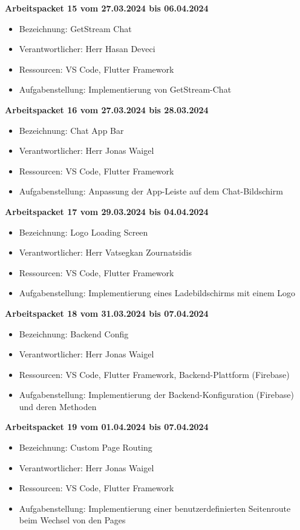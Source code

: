 \textbf{Arbeitspacket 15 vom 27.03.2024 bis 06.04.2024}
\begin{itemize}[itemsep=0pt]
    \item{Bezeichnung: GetStream Chat} 
	\item{Verantwortlicher: Herr Hasan Deveci} 
	\item{Ressourcen: VS Code, Flutter Framework} 
    \item{Aufgabenstellung: Implementierung von GetStream-Chat}
\end{itemize}

\textbf{Arbeitspacket 16 vom 27.03.2024 bis 28.03.2024}
\begin{itemize}[itemsep=0pt]
    \item{Bezeichnung: Chat App Bar}
	\item{Verantwortlicher: Herr Jonas Waigel} 
	\item{Ressourcen: VS Code, Flutter Framework} 
    \item{Aufgabenstellung: Anpassung der App-Leiste auf dem Chat-Bildschirm}
\end{itemize} 

\newpage
\textbf{Arbeitspacket 17 vom 29.03.2024 bis 04.04.2024}
\begin{itemize}[itemsep=0pt]
    \item{Bezeichnung: Logo Loading Screen} 
	\item{Verantwortlicher: Herr Vatsegkan Zournatsidis} 
	\item{Ressourcen: VS Code, Flutter Framework} 
    \item{Aufgabenstellung: Implementierung eines Ladebildschirms mit einem Logo}
\end{itemize}

\textbf{Arbeitspacket 18 vom 31.03.2024 bis 07.04.2024}
\begin{itemize}[itemsep=0pt]
    \item{Bezeichnung: Backend Config} 
	\item{Verantwortlicher: Herr Jonas Waigel} 
	\item{Ressourcen: VS Code, Flutter Framework, Backend-Plattform (Firebase)}
    \item{Aufgabenstellung: Implementierung der Backend-Konfiguration (Firebase) und deren Methoden} 
\end{itemize}

\textbf{Arbeitspacket 19 vom 01.04.2024 bis 07.04.2024}
\begin{itemize}[itemsep=0pt]
    \item{Bezeichnung: Custom Page Routing} 
	\item{Verantwortlicher: Herr Jonas Waigel} 
	\item{Ressourcen: VS Code, Flutter Framework} 
    \item{Aufgabenstellung: Implementierung einer benutzerdefinierten Seitenroute beim Wechsel von den Pages}
\end{itemize} 

